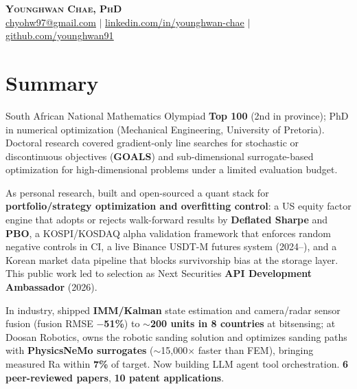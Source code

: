 \documentclass[letterpaper,11pt]{article}
\begin{document}
\begin{center}
    \textbf{\Huge \scshape Younghwan Chae, PhD} \\ \vspace{3pt}
    \small
    \href{mailto:chyohw97@gmail.com}{\underline{chyohw97@gmail.com}} \quad$|$\quad
    \href{https://www.linkedin.com/in/younghwan-chae/}{\underline{linkedin.com/in/younghwan-chae}} \quad$|$\quad
    \href{https://github.com/younghwan91}{\underline{github.com/younghwan91}}
\end{center}

\section{Summary}
\small{
South African National Mathematics Olympiad \textbf{Top 100} (2nd in province); PhD in numerical optimization (Mechanical Engineering, University of Pretoria). Doctoral research covered gradient-only line searches for stochastic or discontinuous objectives (\textbf{GOALS}) and sub-dimensional surrogate-based optimization for high-dimensional problems under a limited evaluation budget.

\vspace{2pt}\noindent As personal research, built and open-sourced a quant stack for \textbf{portfolio/strategy optimization and overfitting control}: a US equity factor engine that adopts or rejects walk-forward results by \textbf{Deflated Sharpe} and \textbf{PBO}, a KOSPI/KOSDAQ alpha validation framework that enforces random negative controls in CI, a live Binance USDT-M futures system (2024--), and a Korean market data pipeline that blocks survivorship bias at the storage layer. This public work led to selection as Next Securities \textbf{API Development Ambassador} (2026).

\vspace{2pt}\noindent In industry, shipped \textbf{IMM/Kalman} state estimation and camera/radar sensor fusion (fusion RMSE \textbf{$-$51\%}) to \textbf{$\sim$200 units in 8 countries} at bitsensing; at Doosan Robotics, owns the robotic sanding solution and optimizes sanding paths with \textbf{PhysicsNeMo surrogates} ($\sim$15,000$\times$ faster than FEM), bringing measured Ra within \textbf{7\%} of target. Now building LLM agent tool orchestration. \textbf{6 peer-reviewed papers}, \textbf{10 patent applications}.
}

\end{document}
